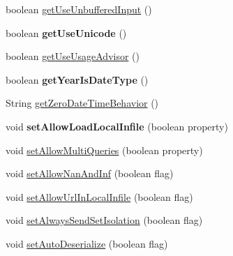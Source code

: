 \begin{DoxyCompactItemize}
\item 
boolean \mbox{\hyperlink{interfacecom_1_1mysql_1_1jdbc_1_1_connection_properties_a7776bd98c8537739178d1c9a42bd9e8c}{get\+Use\+Unbuffered\+Input}} ()
\item 
\mbox{\label{interfacecom_1_1mysql_1_1jdbc_1_1_connection_properties_a1d88ad25903075f400dc7a7a0a6b0ac1}} 
boolean {\bfseries get\+Use\+Unicode} ()
\item 
boolean \mbox{\hyperlink{interfacecom_1_1mysql_1_1jdbc_1_1_connection_properties_ac3d940436d5babe33067c3f75817e9a9}{get\+Use\+Usage\+Advisor}} ()
\item 
\mbox{\label{interfacecom_1_1mysql_1_1jdbc_1_1_connection_properties_a98c11780d6f32cc54092ab5efe01f606}} 
boolean {\bfseries get\+Year\+Is\+Date\+Type} ()
\item 
String \mbox{\hyperlink{interfacecom_1_1mysql_1_1jdbc_1_1_connection_properties_a1101064e308d3d8aabe9560851a5d6b6}{get\+Zero\+Date\+Time\+Behavior}} ()
\item 
\mbox{\label{interfacecom_1_1mysql_1_1jdbc_1_1_connection_properties_a27a3ec71c30d3f5d8e9a1f41c5850830}} 
void {\bfseries set\+Allow\+Load\+Local\+Infile} (boolean property)
\item 
void \mbox{\hyperlink{interfacecom_1_1mysql_1_1jdbc_1_1_connection_properties_ac1ed5c3bc5f7f6c977f499b6560ef5a4}{set\+Allow\+Multi\+Queries}} (boolean property)
\item 
void \mbox{\hyperlink{interfacecom_1_1mysql_1_1jdbc_1_1_connection_properties_aed2f8233f5faee7186e807c4f737b12d}{set\+Allow\+Nan\+And\+Inf}} (boolean flag)
\item 
void \mbox{\hyperlink{interfacecom_1_1mysql_1_1jdbc_1_1_connection_properties_ad7e99f72c64f4572e9952747489da7b4}{set\+Allow\+Url\+In\+Local\+Infile}} (boolean flag)
\item 
void \mbox{\hyperlink{interfacecom_1_1mysql_1_1jdbc_1_1_connection_properties_a009faf68759b3c9b1c03a15abeff987c}{set\+Always\+Send\+Set\+Isolation}} (boolean flag)
\item 
void \mbox{\hyperlink{interfacecom_1_1mysql_1_1jdbc_1_1_connection_properties_ac22dc46adecba26efb43a6fdc239e292}{set\+Auto\+Deserialize}} (boolean flag)
\item 
\mbox{\label{interfacecom_1_1mysql_1_1jdbc_1_1_connection_properties_a3f76569157897e4ea3c035508266068b}} 

\end{DoxyCompactItemize}
